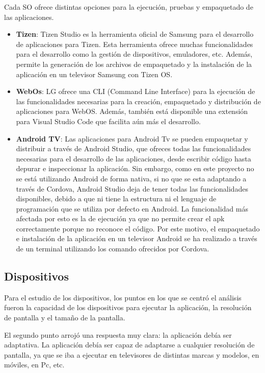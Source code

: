 Cada SO ofrece distintas opciones para la ejecución, pruebas y empaquetado de las aplicaciones.

\begin{itemize}
    \item \textbf{Tizen}: Tizen Studio es la herramienta oficial de Samsung para el desarrollo de aplicaciones para Tizen. 
    Esta herramienta ofrece muchas funcionalidades para el desarrollo como la gestión de dispositivos, emuladores, etc. 
    Además, permite la generación de los archivos de empaquetado y la instalación de la aplicación en un televisor Samsung con Tizen OS.
    \item \textbf{WebOs}: LG ofrece una CLI (Command Line Interface) para la ejecución de las funcionalidades necesarias para la creación, 
    empaquetado y distribución de aplicaciones para WebOS. Además, también está disponible una extensión para Visual Studio Code que facilita aún más el desarrollo.
    \item \textbf{Android TV}: Las aplicaciones para Android Tv se pueden empaquetar y distribuir a través de Android Studio, que ofreces todas las funcionalidades
    necesarias para el desarrollo de las aplicaciones, desde escribir código hasta depurar e inspeccionar la aplicación. Sin embargo, como en este 
    proyecto no se está utilizando Android de forma nativa, si no que se esta adaptando a través de Cordova, Android Studio deja de tener todas las funcionalidades
    disponibles, debido a que ni tiene la estructura ni el lenguaje de programación que se utiliza por defecto en Android. La funcionalidad más afectada
    por esto es la de ejecución ya que no permite crear el apk correctamente porque no reconoce el código.  Por este motivo, el empaquetado e instalación 
    de la aplicación en un televisor Android se ha realizado a través de un terminal utilizando los comando ofrecidos por Cordova. 
\end{itemize}


\subsection{Dispositivos}
\label{subsec:analisis_estudio_dispositivos}

Para el estudio de los dispositivos, los puntos en los que se centró el análisis fueron la capacidad de los 
dispositivos para ejecutar la aplicación, la resolución de pantalla y el tamaño de la pantalla.

El segundo punto arrojó una respuesta muy clara: la aplicación debía ser adaptativa. La aplicación debía ser capaz
de adaptarse a cualquier resolución de pantalla, ya que se iba a ejecutar en televisores de distintas marcas y modelos, en 
móviles, en Pc, etc.

